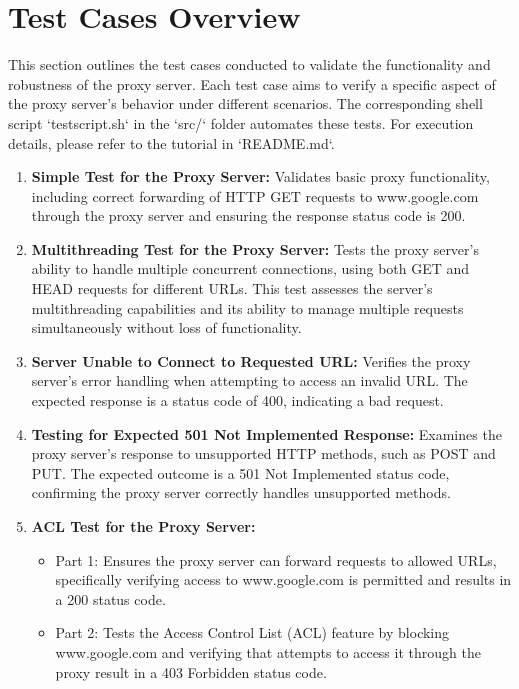\documentclass{article}
\begin{document}
\section*{Test Cases Overview}
This section outlines the test cases conducted to validate the functionality and robustness of the proxy server. Each test case aims to verify a specific aspect of the proxy server's behavior under different scenarios. The corresponding shell script `testscript.sh` in the `src/` folder automates these tests. For execution details, please refer to the tutorial in `README.md`.

\begin{enumerate}
    \item \textbf{Simple Test for the Proxy Server:}
    Validates basic proxy functionality, including correct forwarding of HTTP GET requests to www.google.com through the proxy server and ensuring the response status code is 200.
    
    \item \textbf{Multithreading Test for the Proxy Server:}
    Tests the proxy server's ability to handle multiple concurrent connections, using both GET and HEAD requests for different URLs. This test assesses the server's multithreading capabilities and its ability to manage multiple requests simultaneously without loss of functionality.
    
    \item \textbf{Server Unable to Connect to Requested URL:}
    Verifies the proxy server's error handling when attempting to access an invalid URL. The expected response is a status code of 400, indicating a bad request.
    
    \item \textbf{Testing for Expected 501 Not Implemented Response:}
    Examines the proxy server's response to unsupported HTTP methods, such as POST and PUT. The expected outcome is a 501 Not Implemented status code, confirming the proxy server correctly handles unsupported methods.
    
    \item \textbf{ACL Test for the Proxy Server:}
    \begin{itemize}
        \item Part 1: Ensures the proxy server can forward requests to allowed URLs, specifically verifying access to www.google.com is permitted and results in a 200 status code.
        \item Part 2: Tests the Access Control List (ACL) feature by blocking www.google.com and verifying that attempts to access it through the proxy result in a 403 Forbidden status code.
    \end{itemize}
\end{enumerate}
\end{document}
